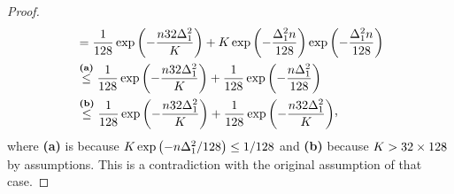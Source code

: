 \begin{proof}
\begin{align*}
 &=
 \frac{1}{128}\exp\left( -\frac{\timeHorizon32\gap^2_1 }{\nArms}\right)
 +
\nArms\exp\left(-\frac{\gap^2_1\timeHorizon}{128}\right)\exp\left(-\frac{\gap^2_1\timeHorizon}{128}\right)\\
 &\stackrel{\textbf{(a)}}{\leq}
   \frac{1}{128}\exp\left( -\frac{\timeHorizon32\gap^2_1 }{\nArms}\right)
 +
 \frac{1}{128}\exp\left( -\frac{\timeHorizon\gap^2_1}{128}\right)\\
 &\stackrel{\textbf{(b)}}{\leq}
 \frac{1}{128}\exp\left( -\frac{\timeHorizon32\gap^2_1 }{\nArms}\right)
 +
 \frac{1}{128}\exp\left( -\frac{\timeHorizon32\gap^2_1 }{\nArms}\right)\!\CommaBin
\end{align*}
where \textbf{\textbf{(a)}} is because
$K\exp\left( -n\Delta^2_1 /128\right)\leq 1/128$ 
 and 
 \textbf{(b)}
because $K>32\times128$
 by assumptions.
	This is a contradiction with the original assumption of that case.
	


\end{proof}
